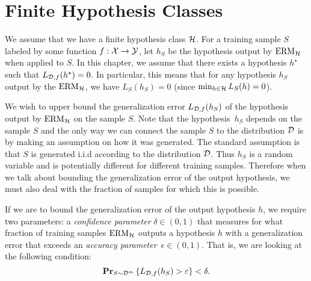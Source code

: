 \section{Finite Hypothesis Classes}

We assume that we have a finite hypothesis class $\mathcal{H}$. For a training
sample $S$ labeled by some function $f: \mathcal{X} \rightarrow \mathcal{Y}$, let $h_S$
be the hypothesis output by $\text{ERM}_{\mathcal{H}}$ when applied to $S$. In this chapter,
we assume that there exists a hypothesis $h^{\star}$ such that
$L_{\mathcal{D}, f}(h^{\star}) = 0$. In particular, this means that for any hypothesis $h_S$
output by the $\text{ERM}_{\mathcal{H}}$, we have $L_S(h_S) = 0$ (since
$\min_{h \in \mathcal{H}} L_S(h) = 0$).

We wish to upper bound the generalization error $L_{\mathcal{D}, f}(h_S)$ of the hypothesis
output by $\text{ERM}_{\mathcal{H}}$ on the sample $S$. Note that the hypothesis~$h_S$ depends
on the sample $S$ and the only way we can connect the sample $S$ to the distribution
$\mathcal{D}$ is by making an assumption on how it was generated. The standard assumption
is that $S$ is generated i.i.d according to the distribution $\mathcal{D}$. Thus $h_S$ is
a random variable and is potentially different for different training samples.
Therefore when we talk about bounding the generalization error of the output
hypothesis, we must also deal with the fraction of samples for which this is
possible.

If we are to bound the generalization error of the output hypothesis $h$,
we require two parameters:
a \emph{confidence parameter} $\delta \in (0, 1)$ that measures for what fraction
of training samples $\text{ERM}_{\mathcal{H}}$ outputs a hypothesis $h$ with a
generalization error that exceeds an \emph{accuracy parameter}~$\epsilon \in (0, 1)$.
That is, we are looking at the following condition:
\begin{equation}
    \mathbf{Pr}_{S \sim \mathcal{D}^m} \left \{ L_{\mathcal{D}, f}(h_S) > \varepsilon \right \} < \delta.
\end{equation}




